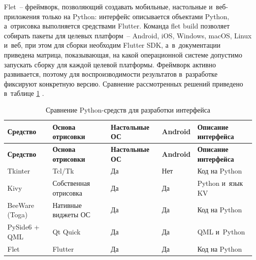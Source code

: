 \documentclass[14pt,a4paper]{extarticle}
\begin{document}
Flet~– фреймворк, позволяющий создавать мобильные, настольные и~веб-приложения только на Python: интерфейс описывается объектами Python, а~отрисовка выполняется средствами Flutter. Команда flet build позволяет собирать пакеты для целевых платформ~– Android, iOS, Windows, macOS, Linux и~веб, при этом для сборки необходим Flutter SDK, а~в~документации приведена матрица, показывающая, на какой операционной системе допустимо запускать сборку для каждой целевой платформы. Фреймворк активно развивается, поэтому для воспроизводимости результатов в~разработке фиксируют конкретную версию. Сравнение рассмотренных решений приведено в~таблице \ref{tab:2.1} \cite{b3}.



\begingroup\small\singlespacing\setlength{\LTpre}{6pt}\setlength{\LTpost}{10pt}
\begin{longtable}{|>{\raggedright\arraybackslash}p{}|>{\raggedright\arraybackslash}p{}|>{\centering\arraybackslash}p{}|>{\centering\arraybackslash}p{}|>{\raggedright\arraybackslash}p{}|}
\caption{Сравнение Python-средств для разработки интерфейса}\label{tab:2.1}\\
\hline
\rowcolor{gray!15}\centering\arraybackslash\bfseries Средство & \centering\arraybackslash\bfseries Основа отрисовки & \centering\arraybackslash\bfseries Настольные ОС & \centering\arraybackslash\bfseries Android & \centering\arraybackslash\bfseries Описание интерфейса \\ \hline
\endfirsthead
\hline
\rowcolor{gray!15}\centering\arraybackslash\bfseries Средство & \centering\arraybackslash\bfseries Основа отрисовки & \centering\arraybackslash\bfseries Настольные ОС & \centering\arraybackslash\bfseries Android & \centering\arraybackslash\bfseries Описание интерфейса \\ \hline
\endhead
Tkinter & Tcl/Tk & \centering\arraybackslash Да & \centering\arraybackslash Нет & Код на Python \\ \hline
Kivy & Собственная отрисовка & \centering\arraybackslash Да & \centering\arraybackslash Да & Python и~язык KV \\ \hline
BeeWare (Toga) & Нативные виджеты ОС & \centering\arraybackslash Да & \centering\arraybackslash Да & Код на Python \\ \hline
PySide6 + QML & Qt Quick & \centering\arraybackslash Да & \centering\arraybackslash Да & QML и~Python \\ \hline
Flet & Flutter & \centering\arraybackslash Да & \centering\arraybackslash Да & Код на Python \\ \hline
\end{longtable}\endgroup
\end{document}
